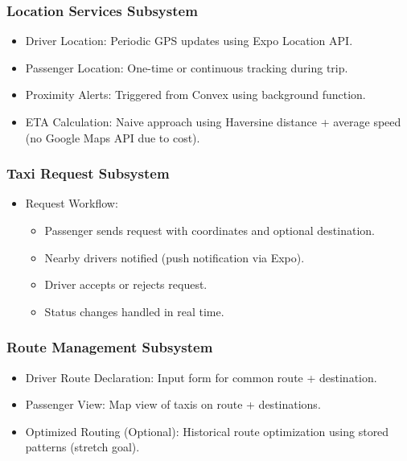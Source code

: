 \documentclass[a4paper,12pt]{article}
\begin{document}
\subsubsection*{Location Services Subsystem}
\begin{itemize}
    \item Driver Location: Periodic GPS updates using Expo Location API.
    \item Passenger Location: One-time or continuous tracking during trip.
    \item Proximity Alerts: Triggered from Convex using background function.
    \item ETA Calculation: Naive approach using Haversine distance + average speed (no Google Maps API due to cost).
\end{itemize}

\subsubsection*{Taxi Request Subsystem}
\begin{itemize}
    \item Request Workflow:
    \begin{itemize}
        \item Passenger sends request with coordinates and optional destination.
        \item Nearby drivers notified (push notification via Expo).
        \item Driver accepts or rejects request.
        \item Status changes handled in real time.
    \end{itemize}
\end{itemize}

\subsubsection*{Route Management Subsystem}
\begin{itemize}
    \item Driver Route Declaration: Input form for common route + destination.
    \item Passenger View: Map view of taxis on route + destinations.
    \item Optimized Routing (Optional): Historical route optimization using stored patterns (stretch goal).
\end{itemize}
\end{document}
